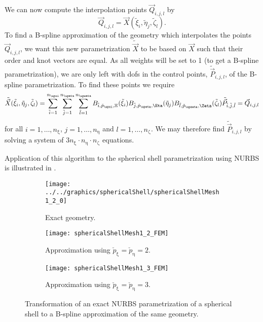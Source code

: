We can now compute the interpolation points $\vec{Q}_{i,j,l}$ by
\begin{equation}
	\vec{Q}_{i,j,l} = \vec{X}(\tilde{\xi}_i,\tilde{\eta}_j,\tilde{\zeta}_l).
\end{equation}
To find a B-spline approximation of the geometry which interpolates the points $\vec{Q}_{i,j,l}$, we want this new parametrization $\tilde{\vec{X}}$ to be based on $\vec{X}$ such that their order and knot vectors are equal. As all weights will be set to 1 (to get a B-spline parametrization), we are only left with dofs in the control points, $\tilde{\vec{P}}_{i,j,l}$, of the B-spline parametrization. To find these points we require
\begin{equation}
	\tilde{\vec{X}}(\tilde{\xi}_i,\tilde{\eta}_j,\tilde{\zeta}_l) = \sum_{\tilde{i}=1}^{n_\upxi}\sum_{\tilde{j}=1}^{n_\upeta}\sum_{\tilde{l}=1}^{n_\upzeta} B_{\tilde{i},\check{p}_\upxi,\Xi}(\tilde{\xi}_i)B_{\tilde{j},\check{p}_\upeta,\Eta}(\tilde{\eta}_j)B_{\tilde{l},\check{p}_\upzeta,\Zeta}(\tilde{\zeta}_l)\tilde{\vec{P}}_{\tilde{i},\tilde{j},\tilde{l}} = \vec{Q}_{i,j,l}
\end{equation}
for all $i=1,\dots,n_\upxi$, $j=1,\dots,n_\upeta$ and $l=1,\dots,n_\upzeta$. We may therefore find $\tilde{\vec{P}}_{i,j,l}$ by solving a system of $3n_\upxi\cdot n_\upeta\cdot n_\upzeta$ equations.

Application of this algorithm to the spherical shell parametrization using NURBS is illustrated in .
\begin{figure}
	\centering        
	\begin{subfigure}[t]{0.26\textwidth}
		\centering
		\texttt{[image: ../../graphics/sphericalShell/sphericalShellMesh1\_2\_0]}
		\caption{Exact geometry.}
	\end{subfigure}%
	\hspace*{0.11\textwidth}%
	\begin{subfigure}[t]{0.26\textwidth}
		\centering
		\texttt{[image: sphericalShellMesh1\_2\_FEM]}
		\caption{Approximation using $\check{p}_\upxi=\check{p}_\upeta=2$.}
	\end{subfigure}%
	\hspace*{0.11\textwidth}%
	\begin{subfigure}[t]{0.26\textwidth}
		\centering
		\texttt{[image: sphericalShellMesh1\_3\_FEM]}
		\caption{Approximation using $\check{p}_\upxi=\check{p}_\upeta=3$.}
	\end{subfigure}
	\caption{Transformation of an exact NURBS parametrization of a spherical shell to a B-spline approximation of the same geometry.}
	\label{Fig2:NURBStoBsplineTransVis}
\end{figure}
